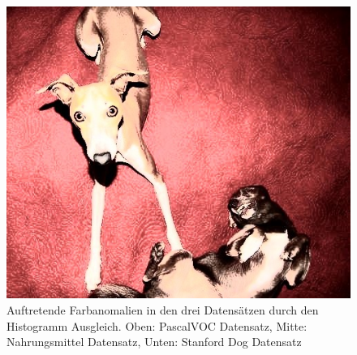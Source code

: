 \begin{appendices}
\begin{figure}[htb]
\begin{minipage}{0.19\textwidth}
\includegraphics[width=\textwidth]{images/anomalien/HA/n02091032_12113.jpg}
\end{minipage}
\caption{Auftretende Farbanomalien in den drei Datensätzen durch den Histogramm Ausgleich. Oben: PascalVOC Datensatz, Mitte: Nahrungsmittel Datensatz, Unten: Stanford Dog Datensatz}
\label{img:anoHA}
\end{figure}


\end{appendices}
